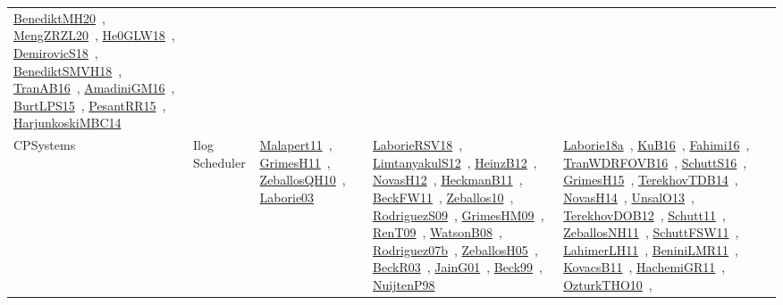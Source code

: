 {\begin{longtable}{lp{3cm}>{\raggedright\arraybackslash}p{6cm}>{\raggedright\arraybackslash}p{6cm}>{\raggedright\arraybackslash}p{8cm}}
\href{../works/BenediktMH20.pdf}{BenediktMH20}~\cite{BenediktMH20}, \href{../works/MengZRZL20.pdf}{MengZRZL20}~\cite{MengZRZL20}, \href{../works/He0GLW18.pdf}{He0GLW18}~\cite{He0GLW18}, \href{../works/DemirovicS18.pdf}{DemirovicS18}~\cite{DemirovicS18}, \href{../works/BenediktSMVH18.pdf}{BenediktSMVH18}~\cite{BenediktSMVH18}, \href{../works/TranAB16.pdf}{TranAB16}~\cite{TranAB16}, \href{../works/AmadiniGM16.pdf}{AmadiniGM16}~\cite{AmadiniGM16}, \href{../works/BurtLPS15.pdf}{BurtLPS15}~\cite{BurtLPS15}, \href{../works/PesantRR15.pdf}{PesantRR15}~\cite{PesantRR15}, \href{../works/HarjunkoskiMBC14.pdf}{HarjunkoskiMBC14}~\cite{HarjunkoskiMBC14}\\
\index{Ilog Scheduler}\index{CPSystems!Ilog Scheduler}CPSystems & Ilog Scheduler & \href{../works/Malapert11.pdf}{Malapert11}~\cite{Malapert11}, \href{../works/GrimesH11.pdf}{GrimesH11}~\cite{GrimesH11}, \href{../works/ZeballosQH10.pdf}{ZeballosQH10}~\cite{ZeballosQH10}, \href{../works/Laborie03.pdf}{Laborie03}~\cite{Laborie03} & \href{../works/LaborieRSV18.pdf}{LaborieRSV18}~\cite{LaborieRSV18}, \href{../works/LimtanyakulS12.pdf}{LimtanyakulS12}~\cite{LimtanyakulS12}, \href{../works/HeinzB12.pdf}{HeinzB12}~\cite{HeinzB12}, \href{../works/NovasH12.pdf}{NovasH12}~\cite{NovasH12}, \href{../works/HeckmanB11.pdf}{HeckmanB11}~\cite{HeckmanB11}, \href{../works/BeckFW11.pdf}{BeckFW11}~\cite{BeckFW11}, \href{../works/Zeballos10.pdf}{Zeballos10}~\cite{Zeballos10}, \href{../works/RodriguezS09.pdf}{RodriguezS09}~\cite{RodriguezS09}, \href{../works/GrimesHM09.pdf}{GrimesHM09}~\cite{GrimesHM09}, \href{../works/RenT09.pdf}{RenT09}~\cite{RenT09}, \href{../works/WatsonB08.pdf}{WatsonB08}~\cite{WatsonB08}, \href{../works/Rodriguez07b.pdf}{Rodriguez07b}~\cite{Rodriguez07b}, \href{../works/ZeballosH05.pdf}{ZeballosH05}~\cite{ZeballosH05}, \href{../works/BeckR03.pdf}{BeckR03}~\cite{BeckR03}, \href{../works/JainG01.pdf}{JainG01}~\cite{JainG01}, \href{../works/Beck99.pdf}{Beck99}~\cite{Beck99}, \href{../works/NuijtenP98.pdf}{NuijtenP98}~\cite{NuijtenP98} & \href{../works/Laborie18a.pdf}{Laborie18a}~\cite{Laborie18a}, \href{../works/KuB16.pdf}{KuB16}~\cite{KuB16}, \href{../works/Fahimi16.pdf}{Fahimi16}~\cite{Fahimi16}, \href{../works/TranWDRFOVB16.pdf}{TranWDRFOVB16}~\cite{TranWDRFOVB16}, \href{../works/SchuttS16.pdf}{SchuttS16}~\cite{SchuttS16}, \href{../works/GrimesH15.pdf}{GrimesH15}~\cite{GrimesH15}, \href{../works/TerekhovTDB14.pdf}{TerekhovTDB14}~\cite{TerekhovTDB14}, \href{../works/NovasH14.pdf}{NovasH14}~\cite{NovasH14}, \href{../works/UnsalO13.pdf}{UnsalO13}~\cite{UnsalO13}, \href{../works/TerekhovDOB12.pdf}{TerekhovDOB12}~\cite{TerekhovDOB12}, \href{../works/Schutt11.pdf}{Schutt11}~\cite{Schutt11}, \href{../works/ZeballosNH11.pdf}{ZeballosNH11}~\cite{ZeballosNH11}, \href{../works/SchuttFSW11.pdf}{SchuttFSW11}~\cite{SchuttFSW11}, \href{../works/LahimerLH11.pdf}{LahimerLH11}~\cite{LahimerLH11}, \href{../works/BeniniLMR11.pdf}{BeniniLMR11}~\cite{BeniniLMR11}, \href{../works/KovacsB11.pdf}{KovacsB11}~\cite{KovacsB11}, \href{../works/HachemiGR11.pdf}{HachemiGR11}~\cite{HachemiGR11}, \href{../works/OzturkTHO10.pdf}{OzturkTHO10}~\cite{OzturkTHO10}, 
\end{longtable}}
